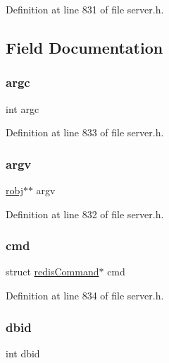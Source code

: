 Definition at line 831 of file server.\+h.



\subsection{Field Documentation}
\mbox{\label{structredis_op_ad1447518f4372828b8435ae82e48499e}} 
\subsubsection{\texorpdfstring{argc}{argc}}
{\footnotesize\ttfamily int argc}



Definition at line 833 of file server.\+h.

\mbox{\label{structredis_op_a5c75dd3cb8eb8a3f5be7d4fdf48a9ef9}} 
\subsubsection{\texorpdfstring{argv}{argv}}
{\footnotesize\ttfamily \hyperlink{server_8h_a540f174d2685422fbd7d12e3cd44c8e2}{robj}$\ast$$\ast$ argv}



Definition at line 832 of file server.\+h.

\mbox{\label{structredis_op_a8ed6c4d0c6382ad1787b32d10db25c5e}} 
\subsubsection{\texorpdfstring{cmd}{cmd}}
{\footnotesize\ttfamily struct \hyperlink{structredis_command}{redis\+Command}$\ast$ cmd}



Definition at line 834 of file server.\+h.

\mbox{\label{structredis_op_adc62368127157e2b3ff9cabe77f4f337}} 
\subsubsection{\texorpdfstring{dbid}{dbid}}
{\footnotesize\ttfamily int dbid}



